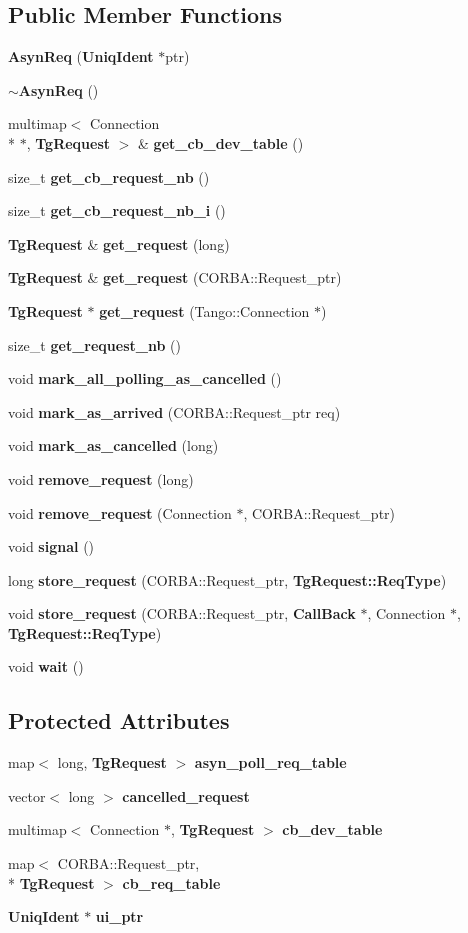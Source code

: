 \subsection*{Public Member Functions}
\begin{DoxyCompactItemize}
\item 
{\bf Asyn\-Req} ({\bf Uniq\-Ident} $\ast$ptr)
\item 
{\bf $\sim$\-Asyn\-Req} ()
\item 
multimap$<$ Connection \\*
$\ast$, {\bf Tg\-Request} $>$ \& {\bf get\-\_\-cb\-\_\-dev\-\_\-table} ()
\item 
size\-\_\-t {\bf get\-\_\-cb\-\_\-request\-\_\-nb} ()
\item 
size\-\_\-t {\bf get\-\_\-cb\-\_\-request\-\_\-nb\-\_\-i} ()
\item 
{\bf Tg\-Request} \& {\bf get\-\_\-request} (long)
\item 
{\bf Tg\-Request} \& {\bf get\-\_\-request} (C\-O\-R\-B\-A\-::\-Request\-\_\-ptr)
\item 
{\bf Tg\-Request} $\ast$ {\bf get\-\_\-request} (Tango\-::\-Connection $\ast$)
\item 
size\-\_\-t {\bf get\-\_\-request\-\_\-nb} ()
\item 
void {\bf mark\-\_\-all\-\_\-polling\-\_\-as\-\_\-cancelled} ()
\item 
void {\bf mark\-\_\-as\-\_\-arrived} (C\-O\-R\-B\-A\-::\-Request\-\_\-ptr req)
\item 
void {\bf mark\-\_\-as\-\_\-cancelled} (long)
\item 
void {\bf remove\-\_\-request} (long)
\item 
void {\bf remove\-\_\-request} (Connection $\ast$, C\-O\-R\-B\-A\-::\-Request\-\_\-ptr)
\item 
void {\bf signal} ()
\item 
long {\bf store\-\_\-request} (C\-O\-R\-B\-A\-::\-Request\-\_\-ptr, {\bf Tg\-Request\-::\-Req\-Type})
\item 
void {\bf store\-\_\-request} (C\-O\-R\-B\-A\-::\-Request\-\_\-ptr, {\bf Call\-Back} $\ast$, Connection $\ast$, {\bf Tg\-Request\-::\-Req\-Type})
\item 
void {\bf wait} ()
\end{DoxyCompactItemize}
\subsection*{Protected Attributes}
\begin{DoxyCompactItemize}
\item 
map$<$ long, {\bf Tg\-Request} $>$ {\bf asyn\-\_\-poll\-\_\-req\-\_\-table}
\item 
vector$<$ long $>$ {\bf cancelled\-\_\-request}
\item 
multimap$<$ Connection $\ast$, {\bf Tg\-Request} $>$ {\bf cb\-\_\-dev\-\_\-table}
\item 
map$<$ C\-O\-R\-B\-A\-::\-Request\-\_\-ptr, \\*
{\bf Tg\-Request} $>$ {\bf cb\-\_\-req\-\_\-table}
\item 
{\bf Uniq\-Ident} $\ast$ {\bf ui\-\_\-ptr}
\end{DoxyCompactItemize}


